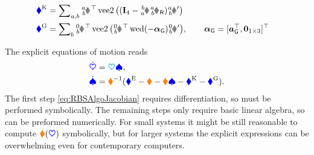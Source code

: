 \begin{enumerate}
\begin{subequations}
\begin{align}
\\
 \genForceStiff &= \sumBodiesAB \bodyJac{\BidxI}{\BidxII}^\top \veeTwoOp \big( (\idMat[4] - \bodyHomoCoord{\BidxII}{\BidxI} \bodyHomoCoordR{\BidxI}{\BidxII}) \bodyStiffMatp{\BidxI}{\BidxII} \big)
\\
 \genForceGravity &= \sumBodies \bodyJac{0}{\BidxII}^\top \veeTwoOp \big( \bodyHomoCoord{0}{\BidxII}^{\top} \wedOp(-\gravityAccWrench) \bodyInertiaMatp{0}{\BidxII} \big), \qquad \gravityAccWrench = [\gravityAcc^\top, \tuple{0}_{1\times3}]^\top
\end{align}
\end{subequations} 
\end{enumerate}
The explicit equations of motion reads
\begin{subequations}
\begin{align}
 \dot{\boldsymbol{\textcolor{blue}{\heartsuit}}} &= \boldsymbol{\textcolor{cyan}{\heartsuit}} \boldsymbol{\textcolor{blue}{\spadesuit}}, 
\\
 \dot{\boldsymbol{\textcolor{blue}{\spadesuit}}} &= \boldsymbol{\textcolor{orange}{\blacklozenge}}^{-1}(\boldsymbol{\textcolor{blue}{\blacklozenge}}^{\mathrm{E}} - \boldsymbol{\textcolor{orange}{\blacklozenge}} - \boldsymbol{\textcolor{orange}{\blacklozenge}}\boldsymbol{\textcolor{blue}{\spadesuit}} - \boldsymbol{\textcolor{blue}{\blacklozenge}}^{\mathrm{K}} - \boldsymbol{\textcolor{blue}{\blacklozenge}}^{\mathrm{G}}).
\end{align}
\end{subequations} 
The first step \eqref{eq:RBSAlgoJacobian} requires differentiation, so must be performed symbolically.
The remaining steps only require basic linear algebra, so can be preformed numerically.
For small systems it might be still reasonable to compute $\boldsymbol{\textcolor{orange}{\blacklozenge}}(\boldsymbol{\textcolor{blue}{\heartsuit}})$ symbolically, but for larger systems the explicit expressions can be overwhelming even for contemporary computers.
